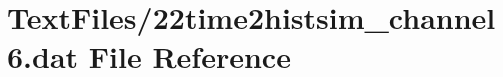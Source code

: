\hypertarget{22time2histsim__channel6_8dat}{}\section{Text\+Files/22time2histsim\+\_\+channel6.dat File Reference}
\label{22time2histsim__channel6_8dat}
